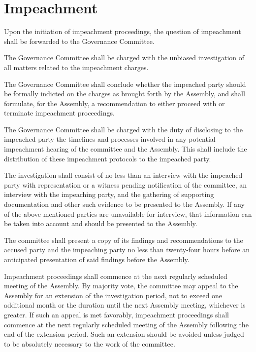\section{Impeachment}
\begin{bylaws-number}
  \item Upon the initiation of impeachment proceedings, the question of impeachment shall be forwarded to the Governance Committee.
  \item The Governance Committee shall be charged with the unbiased investigation of all matters related to the impeachment charges.
  \begin{bylaws-number}
    \item The Governance Committee shall conclude whether the impeached party should be formally indicted on the charges as brought forth by the Assembly, and shall formulate, for the Assembly, a recommendation to either proceed with or terminate impeachment proceedings.
    \item The Governance Committee shall be charged with the duty of disclosing to the impeached party the timelines and processes involved in any potential impeachment hearing of the committee and the Assembly. This shall include the distribution of these impeachment protocols to the impeached party.
    \item The investigation shall consist of no less than an interview with the impeached party with representation or a witness pending notification of the committee, an interview with the impeaching party, and the gathering of supporting documentation and other such evidence to be presented to the Assembly. If any of the above mentioned parties are unavailable for interview, that information can be taken into account and should be presented to the Assembly.
    \item The committee shall present a copy of its findings and recommendations to the accused party and the impeaching party no less than twenty-four hours before an anticipated presentation of said findings before the Assembly.
  \end{bylaws-number}
  \item Impeachment proceedings shall commence at the next regularly scheduled meeting of the Assembly. By majority vote, the committee may appeal to the Assembly for an extension of the investigation period, not to exceed one additional month or the duration until the next Assembly meeting, whichever is greater. If such an appeal is met favorably, impeachment proceedings shall commence at the next regularly scheduled meeting of the Assembly following the end of the extension period. Such an extension should be avoided unless judged to be absolutely necessary to the work of the committee.

\end{bylaws-number}
